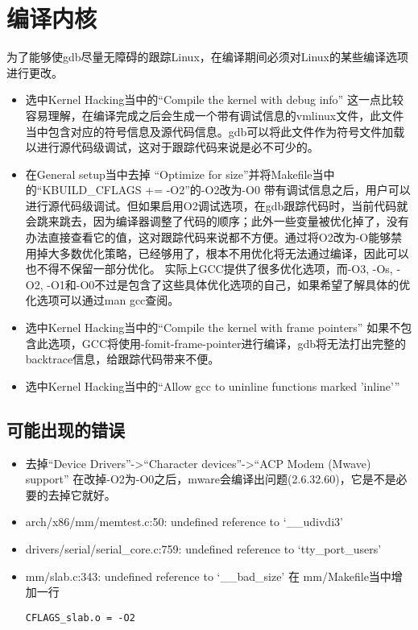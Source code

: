 \documentclass[b5paper,9pt,twoside,openany]{article}
\begin{document}
\section{编译内核}
为了能够使gdb尽量无障碍的跟踪Linux，在编译期间必须对Linux的某些编译选项进行更改。
\begin{itemize}
\item 选中Kernel Hacking当中的“Compile the kernel with debug info”
这一点比较容易理解，在编译完成之后会生成一个带有调试信息的vmlinux文件，此文件当中包含对应的符号信息及源代码信息。gdb可以将此文件作为符号文件加载以进行源代码级调试，这对于跟踪代码来说是必不可少的。
\item 在General setup当中去掉 “Optimize for size”并将Makefile当中的“KBUILD\_CFLAGS   += -O2”的-O2改为-O0
带有调试信息之后，用户可以进行源代码级调试。但如果启用O2调试选项，在gdb跟踪代码时，当前代码就会跳来跳去，因为编译器调整了代码的顺序；此外一些变量被优化掉了，没有办法直接查看它的值，这对跟踪代码来说都不方便。通过将O2改为-O能够禁用掉大多数优化策略，已经够用了，根本不用优化将无法通过编译，因此可以也不得不保留一部分优化。
实际上GCC提供了很多优化选项，而-O3, -Os, -O2, -O1和-O0不过是包含了这些具体优化选项的自己，如果希望了解具体的优化选项可以通过man gcc查阅。
\item 选中Kernel Hacking当中的“Compile the kernel with frame pointers”
如果不包含此选项，GCC将使用-fomit-frame-pointer进行编译，gdb将无法打出完整的backtrace信息，给跟踪代码带来不便。

\item 选中Kernel Hacking当中的“Allow gcc to uninline functions marked 'inline'”
\end{itemize}

\subsection{可能出现的错误}
\begin{itemize}
\item 去掉“Device Drivers”->“Character devices”->“ACP Modem (Mwave) support”
在改掉-O2为-O0之后，mware会编译出问题(2.6.32.60)，它是不是必要的去掉它就好。
\item arch/x86/mm/memtest.c:50: undefined reference to `\_\_udivdi3'
\item drivers/serial/serial\_core.c:759: undefined reference to `tty\_port\_users'
\item mm/slab.c:343: undefined reference to `\_\_bad\_size'
在 mm/Makefile当中增加一行
\begin{lstlisting}
CFLAGS_slab.o = -O2
\end{lstlisting}
\end{itemize}
\end{document}
